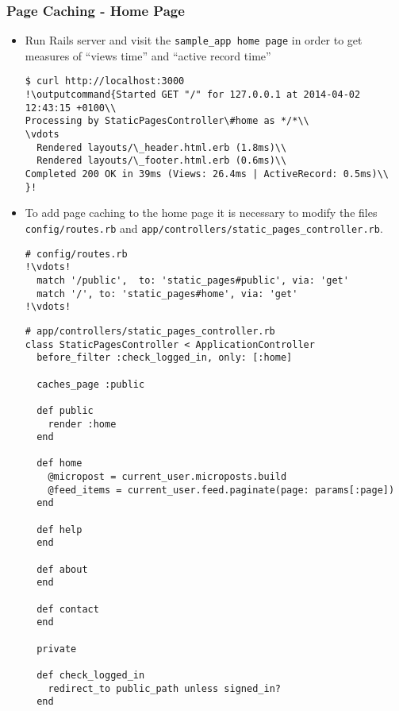 \documentclass{beamer}
\newcommand{\outputcommand}[1]{\color{darkgreen}{#1}}
\begin{document}
\begin{frame}
\frametitle{Page Caching - Home Page}
\begin{itemize}
\item Run Rails server and  visit the \texttt{sample\_app home page} in order to get measures of ``views time'' and ``active record time''
\lstset{language=shell}
\begin{lstlisting}[escapechar=!]
$ curl http://localhost:3000
!\outputcommand{Started GET "/" for 127.0.0.1 at 2014-04-02 12:43:15 +0100\\
Processing by StaticPagesController\#home as */*\\
\vdots
  Rendered layouts/\_header.html.erb (1.8ms)\\
  Rendered layouts/\_footer.html.erb (0.6ms)\\
Completed 200 OK in 39ms (Views: 26.4ms | ActiveRecord: 0.5ms)\\
}!
\end{lstlisting}

\item To add page caching to the home page it is necessary to modify the files \texttt{config/routes.rb} and \texttt{app/controllers/static\_pages\_controller.rb}. 

\lstset{language=Ruby, style=eclipse}
\begin{lstlisting}[escapechar=!]
# config/routes.rb
!\vdots!
  match '/public',  to: 'static_pages#public', via: 'get'
  match '/', to: 'static_pages#home', via: 'get'
!\vdots!
\end{lstlisting}

\lstset{language=Ruby, style=eclipse}
\begin{lstlisting}
# app/controllers/static_pages_controller.rb
class StaticPagesController < ApplicationController
  before_filter :check_logged_in, only: [:home]

  caches_page :public

  def public
    render :home
  end

  def home
    @micropost = current_user.microposts.build
    @feed_items = current_user.feed.paginate(page: params[:page])
  end

  def help
  end

  def about
  end

  def contact
  end

  private

  def check_logged_in
    redirect_to public_path unless signed_in?
  end


\end{lstlisting}
\end{itemize}
\end{frame}
\end{document}
